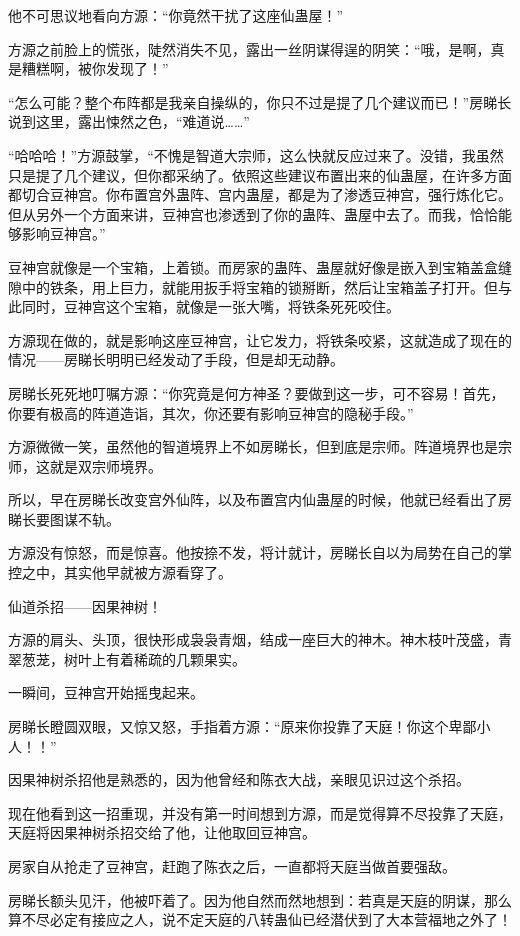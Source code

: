 \begin{this_body}
他不可思议地看向方源：“你竟然干扰了这座仙蛊屋！”

方源之前脸上的慌张，陡然消失不见，露出一丝阴谋得逞的阴笑：“哦，是啊，真是糟糕啊，被你发现了！”

“怎么可能？整个布阵都是我亲自操纵的，你只不过是提了几个建议而已！”房睇长说到这里，露出悚然之色，“难道说……”

“哈哈哈！”方源鼓掌，“不愧是智道大宗师，这么快就反应过来了。没错，我虽然只是提了几个建议，但你都采纳了。依照这些建议布置出来的仙蛊屋，在许多方面都切合豆神宫。你布置宫外蛊阵、宫内蛊屋，都是为了渗透豆神宫，强行炼化它。但从另外一个方面来讲，豆神宫也渗透到了你的蛊阵、蛊屋中去了。而我，恰恰能够影响豆神宫。”

豆神宫就像是一个宝箱，上着锁。而房家的蛊阵、蛊屋就好像是嵌入到宝箱盖盒缝隙中的铁条，用上巨力，就能用扳手将宝箱的锁掰断，然后让宝箱盖子打开。但与此同时，豆神宫这个宝箱，就像是一张大嘴，将铁条死死咬住。

方源现在做的，就是影响这座豆神宫，让它发力，将铁条咬紧，这就造成了现在的情况——房睇长明明已经发动了手段，但是却无动静。

房睇长死死地叮嘱方源：“你究竟是何方神圣？要做到这一步，可不容易！首先，你要有极高的阵道造诣，其次，你还要有影响豆神宫的隐秘手段。”

方源微微一笑，虽然他的智道境界上不如房睇长，但到底是宗师。阵道境界也是宗师，这就是双宗师境界。

所以，早在房睇长改变宫外仙阵，以及布置宫内仙蛊屋的时候，他就已经看出了房睇长要图谋不轨。

方源没有惊怒，而是惊喜。他按捺不发，将计就计，房睇长自以为局势在自己的掌控之中，其实他早就被方源看穿了。

仙道杀招——因果神树！

方源的肩头、头顶，很快形成袅袅青烟，结成一座巨大的神木。神木枝叶茂盛，青翠葱茏，树叶上有着稀疏的几颗果实。

一瞬间，豆神宫开始摇曳起来。

房睇长瞪圆双眼，又惊又怒，手指着方源：“原来你投靠了天庭！你这个卑鄙小人！！”

因果神树杀招他是熟悉的，因为他曾经和陈衣大战，亲眼见识过这个杀招。

现在他看到这一招重现，并没有第一时间想到方源，而是觉得算不尽投靠了天庭，天庭将因果神树杀招交给了他，让他取回豆神宫。

房家自从抢走了豆神宫，赶跑了陈衣之后，一直都将天庭当做首要强敌。

房睇长额头见汗，他被吓着了。因为他自然而然地想到：若真是天庭的阴谋，那么算不尽必定有接应之人，说不定天庭的八转蛊仙已经潜伏到了大本营福地之外了！


\end{this_body}
